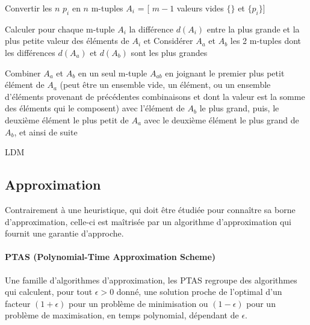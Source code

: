 \documentclass[a4paper,12pt]{report}
\theoremstyle{plain}				%
\theoremstyle{definition}				%
\begin{document}
\bigskip  
\begin{algorithm}[H]
\DontPrintSemicolon
{}

\BlankLine %
Convertir les $n$ $p_i$ en $n$ m-tuples $A_i$ = [ $m-1$ valeurs vides $\{\}$ et $\{p_i\}$]

{
Calculer pour chaque m-tuple $A_i$ la différence $d(A_i)$ 
  entre la plus grande et la plus petite valeur des éléments de $A_i$ et
  Considérer $A_a$ et $A_b$ les 2 m-tuples dont les différences 
  $d(A_a)$ et $d(A_b)$ sont les plus grandes

Combiner $A_a$ et $A_b$ en un seul m-tuple $A_{ab}$ en joignant 
  le premier plus petit élément de $A_a$ 
  (peut être un ensemble vide, 
  un élément, 
  ou un ensemble d'éléments provenant de précédentes combinaisons et 
  dont la valeur est la somme des éléments qui le composent)
  avec l'élément de $A_b$ le plus grand, 
  puis,
  le deuxième élément le plus petit de $A_a$ avec le deuxième élément le plus grand de $A_b$,
  et ainsi de suite 
}

\caption{LDM}
\label{algo:LDM}
\end{algorithm}

\subsection{Approximation}\label{ssec:Approximation}
Contrairement à une heuristique, qui doit être étudiée pour connaître sa borne d'approximation, 
  celle-ci est maîtrisée par un algorithme d'approximation qui fournit une garantie d'approche.

\paragraph{PTAS (Polynomial-Time Approximation Scheme)}
Une famille d'algorithmes d'approximation, les PTAS  
  regroupe des algorithmes qui calculent, pour tout $\epsilon > 0$ donné, 
  une solution proche de l'optimal
  d'un facteur $(1 + \epsilon)$ pour un problème de minimisation 
  ou $(1 - \epsilon)$ pour un problème de maximisation, 
  en temps polynomial, dépendant de $\epsilon$. 
\end{document}
